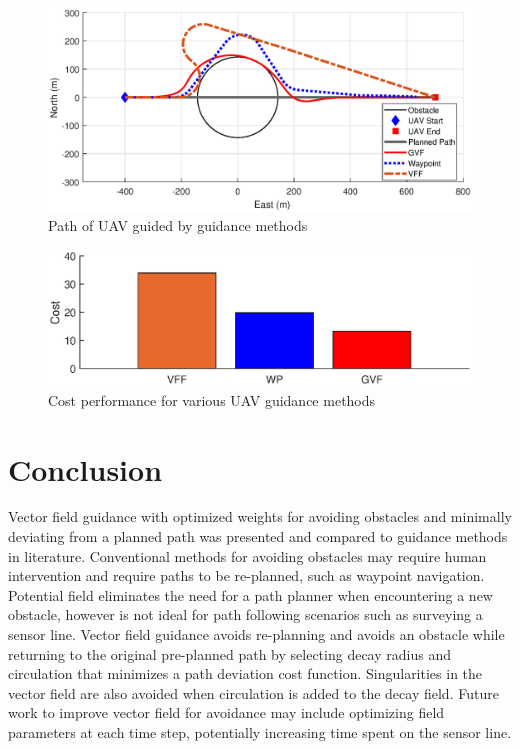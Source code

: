 \documentclass[conf]{new-aiaa}
\begin{document}
\begin{figure}[H]
	\centering
	\includegraphics[trim=0 50 0 65,clip,width=15cm]{Figures/Simulations/compareMethods}
	\caption{Path of UAV guided by guidance methods}
	\label{fig:comparemethods}
\end{figure}


\begin{figure}[H]
	\centering
	\label{fig:barPlotCost}
	\includegraphics[width=15cm]{Figures/Simulations/barPlotPerformance}
	\caption{Cost performance for various UAV guidance methods}
	\label{fig:barplotperformance}
\end{figure}





\section{Conclusion}
Vector field guidance with optimized weights for avoiding obstacles and minimally deviating from a planned path was presented and compared to guidance methods in literature. Conventional methods for avoiding obstacles may require human intervention and require paths to be re-planned, such as waypoint navigation. Potential field eliminates the need for a path planner when encountering a new obstacle, however is not ideal for path following scenarios such as surveying a sensor line. Vector field guidance avoids re-planning and avoids an obstacle while returning to the original pre-planned path by selecting decay radius and circulation that minimizes a path deviation cost function. Singularities in the vector field are also avoided when circulation is added to the decay field. Future work to improve vector field for avoidance may include optimizing field parameters at each time step, potentially increasing time spent on the sensor line.


\end{document}
